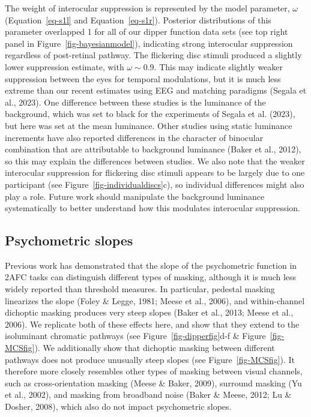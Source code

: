 \documentclass[
  letterpaper,
  DIV=11,
  numbers=noendperiod]{scrartcl}
\begin{document}
The weight of interocular suppression is represented by the model
parameter, \(\omega\) (Equation~\ref{eq-s1l} and Equation~\ref{eq-s1r}).
Posterior distributions of this parameter overlapped 1 for all of our
dipper function data sets (see top right panel in
Figure~\ref{fig-bayesianmodel}), indicating strong interocular
suppression regardless of post-retinal pathway. The flickering disc
stimuli produced a slightly lower suppression estimate, with
\(\omega \sim 0.9\). This may indicate slightly weaker suppression
between the eyes for temporal modulations, but it is much less extreme
than our recent estimates using EEG and matching paradigms (Segala et
al., 2023). One difference between these studies is the luminance of the
background, which was set to black for the experiments of Segala et al.
(2023), but here was set at the mean luminance. Other studies using
static luminance increments have also reported differences in the
character of binocular combination that are attributable to background
luminance (Baker et al., 2012), so this may explain the differences
between studies. We also note that the weaker interocular suppression
for flickering disc stimuli appears to be largely due to one participant
(see Figure~\ref{fig-individualdiscs}c), so individual differences might
also play a role. Future work should manipulate the background luminance
systematically to better understand how this modulates interocular
suppression.

\hypertarget{psychometric-slopes}{%
\subsection{Psychometric slopes}\label{psychometric-slopes}}

Previous work has demonstrated that the slope of the psychometric
function in 2AFC tasks can distinguish different types of masking,
although it is much less widely reported than threshold measures. In
particular, pedestal masking linearizes the slope (Foley \& Legge, 1981;
Meese et al., 2006), and within-channel dichoptic masking produces very
steep slopes (Baker et al., 2013; Meese et al., 2006). We replicate both
of these effects here, and show that they extend to the isoluminant
chromatic pathways (see Figure~\ref{fig-dipperfig}d-f \&
Figure~\ref{fig-MCSfig}). We additionally show that dichoptic masking
between different pathways does not produce unusually steep slopes (see
Figure~\ref{fig-MCSfig}). It therefore more closely resembles other
types of masking between visual channels, such as cross-orientation
masking (Meese \& Baker, 2009), surround masking (Yu et al., 2002), and
masking from broadband noise (Baker \& Meese, 2012; Lu \& Dosher, 2008),
which also do not impact psychometric slopes.
\end{document}
